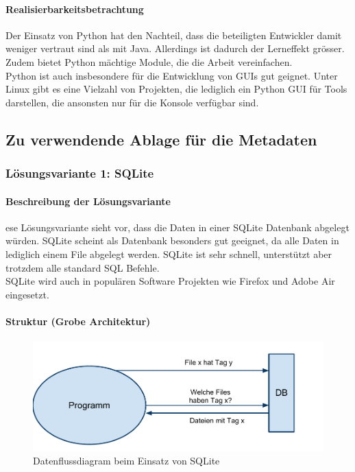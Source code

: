 \documentclass[10pt,paper=a4,final]{scrartcl}
\begin{document}
\paragraph{Realisierbarkeitsbetrachtung}
Der Einsatz von Python hat den Nachteil, dass die beteiligten Entwickler damit weniger vertraut sind als mit Java. Allerdings ist dadurch der Lerneffekt gr\"osser. Zudem bietet Python m\"achtige Module, die die Arbeit vereinfachen.\\
Python ist auch insbesondere f\"ur die Entwicklung von GUIs gut geignet. Unter Linux gibt es eine Vielzahl von Projekten, die lediglich ein Python GUI f\"ur Tools darstellen, die ansonsten nur f\"ur die Konsole verf\"ugbar sind.
\subsection{Zu verwendende Ablage f\"ur die Metadaten}
\subsubsection{L\"osungsvariante 1: SQLite}
\paragraph{Beschreibung der L\"osungsvariante}
ese Lösungsvariante sieht vor, dass die Daten in einer SQLite Datenbank abgelegt würden. SQLite scheint als Datenbank besonders gut geeignet, da alle Daten in lediglich einem File abgelegt werden. SQLite ist sehr schnell, unterstützt aber trotzdem alle standard SQL Befehle.\\
SQLite wird auch in populären Software Projekten wie Firefox und Adobe Air eingesetzt\cite{sqlite}.\\
\paragraph{Struktur (Grobe Architektur)}
  \begin{figure}[h!]
    \includegraphics[width = \textwidth]{datenfluss_db.pdf}
    \caption{Datenflussdiagram beim Einsatz von SQLite}
  \end{figure}
\end{document}
